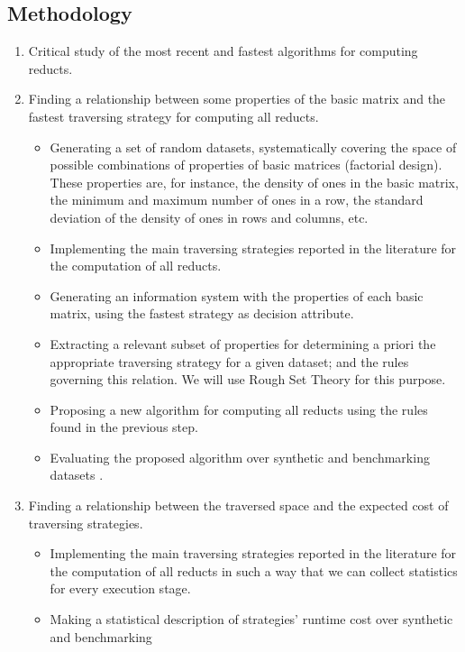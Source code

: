 \documentclass[authoryear,11pt]{elsarticle}
\begin{document}
\subsection{Methodology}\label{Methodology} 
\begin{enumerate}
	\item Critical study of the most recent and fastest algorithms for computing reducts.
	\item Finding a relationship between some properties of the basic matrix and the fastest 
  		  traversing strategy for computing all reducts.\label{task1_all}
	\begin{itemize}
  		\item Generating a set of random datasets, systematically covering the space of possible combinations
  			  of properties of basic matrices (factorial design). These properties are, for instance, the 
  			  density of ones in the basic matrix, the minimum and maximum number of ones in a row, the 
  			  standard deviation of the density of ones in rows and columns, etc.
  		\item Implementing the main traversing strategies reported in the literature for the computation of all
  			  reducts.
  		\item Generating an information system with the properties of each basic matrix, using 
  			  the fastest strategy as decision attribute.
  		\item Extracting a relevant subset of properties for determining a priori the appropriate 
  			  traversing strategy for a given dataset; and the rules governing this relation. We will use
  			  Rough Set Theory for this purpose.
  		\item Proposing a new algorithm for computing all reducts using the rules found in
  			  the previous step.
  		\item Evaluating the proposed algorithm over synthetic and benchmarking datasets \citep{Bache13}.
  	\end{itemize}
  	\item Finding a relationship between the traversed space and the expected cost of traversing strategies.
  	\label{task2_all}
  	\begin{itemize}
  		\item Implementing the main traversing strategies reported in the literature for the computation of all
  			  reducts in such a way that we can collect statistics for every execution stage.
  		\item Making a statistical description  of strategies' runtime cost over synthetic and benchmarking

\end{itemize}
\end{enumerate}
\end{document}

